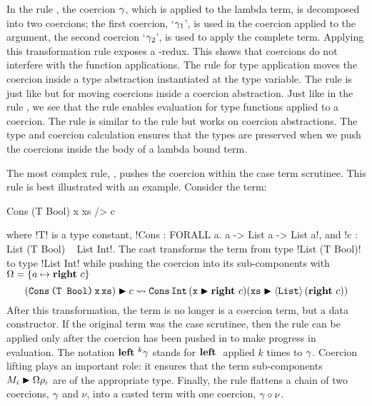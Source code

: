 \documentclass[screen,nonacm,manuscript,review]{acmart} %
\begin{document}
In the rule , the coercion $\gamma$, which is applied to the
lambda term, is decomposed into two coercions; the first coercion,
`$\gamma_1$', is used in the coercion applied to the argument, the second
coercion `$\gamma_2$', is used to apply the complete term. Applying this
transformation rule exposes a \trule{$\beta$}-redux. This shows that
coercions do not interfere with the function applications. The rule
 for type application moves the coercion inside a type
abstraction instantiated at the type variable. The rule
 is just like  but for moving coercions
inside a coercion abstraction. Just like in the rule , we see that
the rule  enables evaluation for type functions applied
to a coercion. The rule  is similar to the rule
 but works on coercion abstractions. The type and
coercion calculation ensures that the types are
preserved when we push the coercions inside the body of a lambda bound term.

The most complex rule, , pushes the coercion within
the case term scrutinee. This rule is best illustrated with an example.
Consider the term:

\begin{CenteredBox}
\begin{code}
Cons (T Bool) x xs /> c
\end{code}
\end{CenteredBox}

where !T! is a type constant, !Cons : FORALL a. a -> List a -> List a!,
and !c : List (T Bool) ~ List Int!.
The cast transforms the term from type !List (T Bool)! to type !List Int!
while pushing the coercion into its sub-components with
$\Omega = \{a \mapsto \textbf{right}~c\}$
\[
(\texttt{Cons}\, \texttt{(T Bool)}\, \texttt{x}\,
                              \texttt{xs})\mathrel{\blacktriangleright}c \rightsquigarrow \texttt{Cons} \, \texttt{Int}\,
                   (\texttt{x}\mathrel{\blacktriangleright}\textbf{right}~c)
                   (\texttt{xs}\mathrel{\blacktriangleright}\langle{\texttt{List}}\rangle\, (\textbf{right}~c))
\]
After this transformation, the term is no longer is a
coercion term, but a data constructor. If the original term
was the case scrutinee, then the rule 
can be applied only after the coercion has been pushed
in to make progress in evaluation. The notation $\textbf{left}~^k \gamma$
stands for $\textbf{left}~$ applied $k$ times to $\gamma$.
Coercion lifting plays an important role: it ensures that the term
sub-components $M_i\mathrel{\blacktriangleright}\Omega\rho_i$ are of
the appropriate type. Finally, the rule 
flattens a chain of two coercions, $\gamma$ and $\nu$, into a casted term
with one coercion, ${\gamma} \circ {\nu}$.
\end{document}
